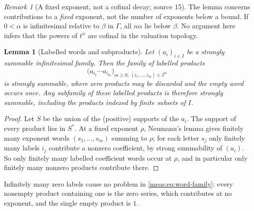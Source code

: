 \documentclass[11pt]{article}
\numberwithin{equation}{section}
\newtheorem{lemma}[theorem]{Lemma}
\theoremstyle{definition}
\theoremstyle{remark}
\newtheorem{remark}[theorem]{Remark}
\begin{document}
\begin{remark}[A fixed exponent, not a cofinal decay; source 15]
\label{meas:rem:cofinal}
The lemma concerns contributions to a \emph{fixed} exponent, not the number of
exponents below a bound. If $0<\alpha$ is infinitesimal relative to $\beta$ in
$\Gamma$, all $n\alpha$ lie below $\beta$. No argument here infers that the
powers of $t^\alpha$ are cofinal in the valuation topology.
\end{remark}

\begin{lemma}[Labelled words and subproducts]\label{meas:lem:labeled}
Let $(a_i)_{i\in I}$ be a strongly summable infinitesimal family. Then the
family of labelled products
\begin{equation}\label{meas:eq:word-family}
 \bigl(a_{i_1}\cdots a_{i_m}\bigr)_{m\ge0,\ (i_1,\ldots,i_m)\in I^m}
\end{equation}
is strongly summable, where zero products may be discarded and the empty word
occurs once. Any subfamily of these labelled products is therefore strongly
summable, including the products indexed by finite subsets of $I$.
\end{lemma}
\begin{proof}
Let $S$ be the union of the (positive) supports of the $a_i$. The support of
every product lies in $S^*$. At a fixed exponent $\rho$, Neumann's lemma gives
finitely many exponent words $(s_1,\ldots,s_m)$ summing to $\rho$; for each
letter $s_j$ only finitely many labels $i_j$ contribute a nonzero coefficient,
by strong summability of $(a_i)$. So only finitely many labelled coefficient
words occur at $\rho$, and in particular only finitely many nonzero products
contribute there.
\end{proof}

Infinitely many zero labels cause no problem in \eqref{meas:eq:word-family}:
every nonempty product containing one is the zero series, which contributes at
no exponent, and the single empty product is $1$.
\end{document}
